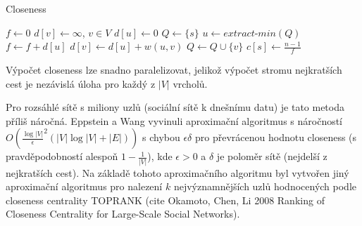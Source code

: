 \documentclass{bakalarka}
\begin{document}
\begin{center}
\begin{minipage}{\textwidth}
\begin{algorithm}[H]
	\caption{Closeness}
		\label{alg:closeness}

	\begin{algorithmic}[1]
	\Statex
		\State $f \gets 0$
		\State $d[v] \gets \infty$, $v \in V$
		\State $d[u] \gets 0$
		\State $Q \gets \{s\}$
			\State $u \gets extract\mbox{-}min(Q)$
			\State $f \gets f + d[u]$
					\State $d[v] \gets d[u] + w(u, v)$
					\State $Q \gets Q \cup \{v\}$
				\EndIf
			\EndFor
		\EndWhile
		\State $c[s] \gets \frac{n - 1}{f}$
	\EndFor
	\end{algorithmic}
\end{algorithm}
\end{minipage}
\end{center}
\mbox{}

Výpočet closeness lze snadno paralelizovat, jelikož výpočet stromu nejkratších
cest je nezávislá úloha pro každý z $|V|$ vrcholů.

Pro rozsáhlé sítě s miliony uzlů (sociální sítě k dnešnímu datu) je tato metoda
příliš náročná. Eppstein a Wang vyvinuli aproximační algoritmus s náročností
$O(\frac{\log|V|}{\epsilon}^2 (|V| \log |V| + |E|))$ s chybou $\epsilon \delta$
pro převrácenou hodnotu closeness (s pravděpodobností alespoň $1 -
\frac{1}{|V|}$), kde $\epsilon > 0$ a $\delta$ je poloměr sítě (nejdelší z
nejkratších cest). Na základě tohoto aproximačního algoritmu byl vytvořen jiný
aproximační algoritmus pro nalezení $k$ nejvýznamnějších uzlů hodnocených podle
closeness centrality TOPRANK (cite Okamoto, Chen, Li 2008 Ranking of Closeness
Centrality for Large-Scale Social Networks).
\end{document}
